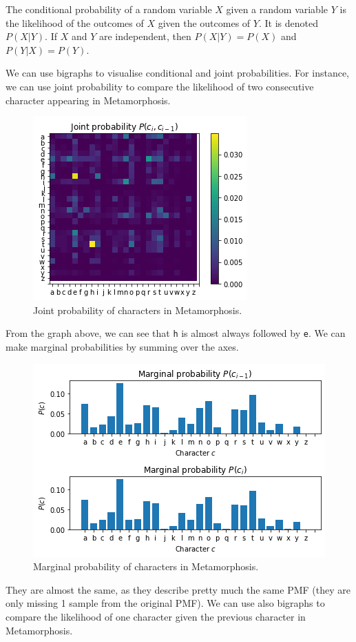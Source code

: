 \documentclass[a4paper, openany]{memoir}
\begin{document}
The conditional probability of a random variable $X$ given a random variable $Y$ is the likelihood of the outcomes of $X$ given the outcomes of $Y$. It is denoted $P(X|Y)$. If $X$ and $Y$ are independent, then $P(X|Y) = P(X)$ and $P(Y|X) = P(Y)$.

We can use bigraphs to visualise conditional and joint probabilities. For instance, we can use joint probability to compare the likelihood of two consecutive character appearing in Metamorphosis.
\begin{figure}[H]
    \centering
    \includegraphics[scale=0.6]{src/5.7 joint probability.png}
    \caption{Joint probability of characters in Metamorphosis.}
\end{figure}
\noindent From the graph above, we can see that \texttt{h} is almost always followed by \texttt{e}. We can make marginal probabilities by summing over the axes.
\begin{figure}[H]
    \centering
    \includegraphics[scale=0.6]{src/5.8 marginal probability.png}
    \caption{Marginal probability of characters in Metamorphosis.}
\end{figure}
\noindent They are almost the same, as they describe pretty much the same PMF (they are only missing 1 sample from the original PMF). We can use also bigraphs to compare the likelihood of one character given the previous character in Metamorphosis.
\end{document}
